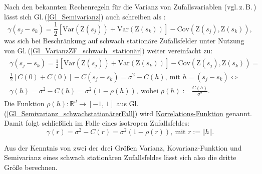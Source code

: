 Nach den bekannten Rechenregeln für die Varianz von
Zufallsvariablen 
(vgl.\,z.\,B.\,\cite[S.\,102]{Henze2019}) lässt sich  
Gl.\,(\ref{Gl_Semivarianz}) auch schreiben als :
\begin{equation}
\gamma(s_j - s_k) = \frac{1}{2} \left[ 
\mathrm{Var} \left( \mathrm{Z}(s_j) \right) + 
\mathrm{Var} \left( \mathrm{Z}(s_k) \right) \right] - 
\mathrm{Cov} \left( \mathrm{Z}(s_j), \mathrm{Z}(s_k) \right),
\end{equation}
was sich bei Beschränkung auf schwach stationäre Zufallsfelder
unter Nutzung von Gl.\,(\ref{Gl_VarianzZF_schwach_stationär})
weiter vereinfacht zu:
\begin{eqnarray}
\begin{gathered}
\label{Gl_Semivarianz_schwachstationärerFall}
\gamma(s_j - s_k) = \frac{1}{2} \left[ 
\mathrm{Var} \left( \mathrm{Z}(s_j) \right) + 
\mathrm{Var} \left( \mathrm{Z}(s_k) \right) \right] - 
\mathrm{Cov} \left( \mathrm{Z}(s_j), \mathrm{Z}(s_k) \right)=\\
\frac{1}{2} \left[ C(0) + C(0) \right] - C(s_j - s_k) =
\sigma^2 - C(h),\ \textrm{mit } h=(s_j - s_k) \Longleftrightarrow\\
\gamma(h) = \sigma^2 - C(h) = 
\sigma^2\left( 1 - \rho(h)\right),\ \textrm{wobei\ }
\rho(h):= \frac{C(h)}{\sigma^2}.
\end{gathered}
\end{eqnarray}
Die Funktion $\rho(h): \mathbb{R}^d \rightarrow [-1,\,1]$ aus 
Gl.\,(\ref{Gl_Semivarianz_schwachstationärerFall}) 
wird \underline{Korrelations-Funktion} genannt.\\

Damit folgt schließlich im Falle eines isotropen Zufallsfeldes:
\begin{equation}
\label{Gl_Semivarianz_isotroperFall}
\gamma(r) = \sigma^2 - C(r) =
\sigma^2 \left( 1- \rho(r)\right),\ \text{mit\ } r:= \Vert h\Vert. 
\end{equation}

Aus der Kenntnis von zwei der drei Größen Varianz, Kovarianz-Funktion
und Semivarianz eines schwach stationären Zufallsfeldes lässt sich 
also die dritte Größe berechnen.

